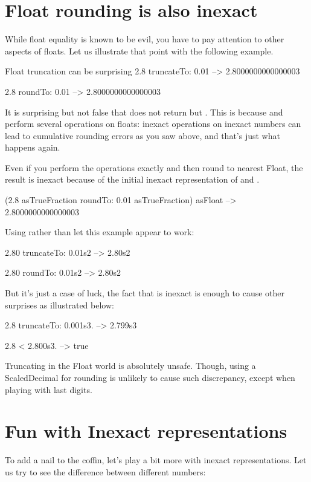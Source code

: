 \documentclass[a4paper,10pt,twoside]{book}
\begin{document}
\section{Float rounding is also inexact}
While float equality is known to be evil, you have to pay attention to other aspects of floats. Let us illustrate that point with the following example.

\begin{code}{Float truncation can be surprising}
2.8 truncateTo: 0.01
	--> 2.8000000000000003

2.8 roundTo: 0.01
	--> 2.8000000000000003
\end{code}

It is surprising but not false that  does not return  but . This is because  and  perform several operations on floats: inexact operations on inexact numbers can lead to cumulative rounding errors as you saw above, and that's just what happens again.

Even if you perform the operations exactly and then round to nearest Float, the result is inexact because of the initial inexact representation of   and  . 
\begin{code}{}
(2.8 asTrueFraction roundTo: 0.01 asTrueFraction) asFloat
	--> 2.8000000000000003
\end{code}

Using  rather than   let this example appear to work:
\begin{code}{}
2.80 truncateTo: 0.01s2
	-->  2.80s2
	
2.80 roundTo: 0.01s2
	-->  2.80s2
\end{code}

But it's just a case of luck, the fact that  is inexact is enough to cause other surprises as illustrated below:
\begin{code}{}
2.8 truncateTo: 0.001s3.
	--> 2.799s3
	
2.8 < 2.800s3.
	--> true
\end{code}

Truncating in the Float world is absolutely unsafe. Though, using a ScaledDecimal for rounding is unlikely to cause such discrepancy, except when playing with last digits.



\section{Fun with Inexact representations}
To add a nail to the coffin, let's play a bit more with inexact representations. Let us try to see the difference between different numbers: 
\end{document}

